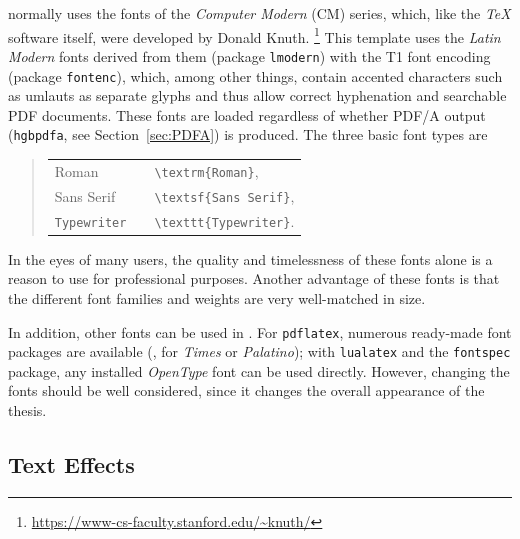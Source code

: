 \latex normally uses the fonts of the \emph{Computer Modern} (CM) series, which,
like the \emph{TeX} software itself, were developed by Donald Knuth.%
\footnote{\url{https://www-cs-faculty.stanford.edu/~knuth/}}
This template uses the \emph{Latin Modern} fonts derived from them (package
\texttt{lmodern}) with the T1 font encoding (package \texttt{fontenc}), which,
among other things, contain accented characters such as umlauts as separate
glyphs and thus allow correct hyphenation and searchable PDF documents. These
fonts are loaded regardless of whether PDF/A output (\texttt{hgbpdfa}, see
Section~\ref{sec:PDFA}) is produced. The three basic font types are
%
\begin{quote}
    \begin{tabular}{lcl}
        \textrm{Roman}      & & \verb!\textrm{Roman}!,      \\
        \textsf{Sans Serif} & & \verb!\textsf{Sans Serif}!, \\
        \texttt{Typewriter} & & \verb!\texttt{Typewriter}!.
    \end{tabular}
\end{quote}
%
In the eyes of many users, the quality and timelessness of these fonts alone is
a reason to use \latex for professional purposes. Another advantage of these
fonts is that the different font families and weights are very well-matched in
size.

In addition, other fonts can be used in \latex. For \texttt{pdflatex},
numerous ready-made font packages are available (\eg, for \emph{Times} or
\emph{Palatino}); with \texttt{lualatex} and the \texttt{fontspec} package, any
installed \emph{OpenType} font can be used directly. However, changing the
fonts should be well considered, since it changes the overall appearance of the
thesis.

\subsection{Text Effects}

